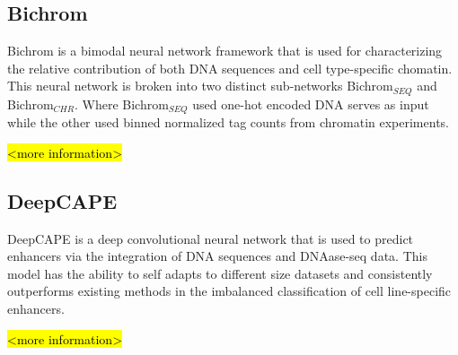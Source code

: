 \subsection*{Bichrom}

Bichrom is a bimodal neural network framework that is used for characterizing the relative contribution of both DNA sequences and cell type-specific chomatin. This neural network is broken into two distinct sub-networks Bichrom$_{SEQ}$ and Bichrom$_{CHR}$. Where Bichrom$_{SEQ}$ used one-hot encoded DNA serves as input while the other used binned normalized tag counts from chromatin experiments.

\hl{<more information>}

\subsection*{DeepCAPE}

DeepCAPE is a deep convolutional neural network that is used to predict enhancers via the integration of DNA sequences and DNAase-seq data. This model has the ability to self adapts to different size datasets and consistently outperforms existing methods in the imbalanced classification of cell line-specific enhancers.

\hl{<more information>}
